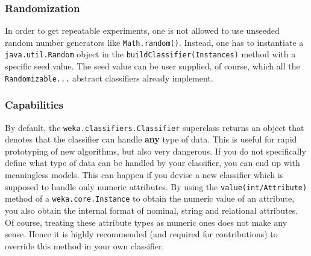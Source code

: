 \subsubsection*{Randomization}
In order to get repeatable experiments, one is not allowed to use unseeded
random number generators like \texttt{Math.random()}. Instead, one has to
instantiate a \texttt{java.util.Random} object in the
\texttt{buildClassifier(Instances)} method with a specific seed value. The seed
value can be user supplied, of course, which all the \texttt{Randomizable...}
abstract classifiers already implement.

\newpage
\subsubsection*{Capabilities}
\label{classifier_capabilities}
By default, the \texttt{weka.classifiers.Classifier} superclass returns an
object that denotes that the classifier can handle \textbf{any} type of data.
This is useful for rapid prototyping of new algorithms, but also very
dangerous. If you do not specifically define what type of data can be handled by
your classifier, you can end up with meaningless models. This can happen if you
devise a new classifier which is supposed to handle only numeric attributes. By
using the \texttt{value(int/Attribute)} method of a \texttt{weka.core.Instance}
to obtain the numeric value of an attribute, you also obtain the internal format
of nominal, string and relational attributes. Of course, treating these
attribute types as numeric ones does not make any sense. Hence it is highly
recommended (and required for contributions) to override this method in your own
classifier. \\

